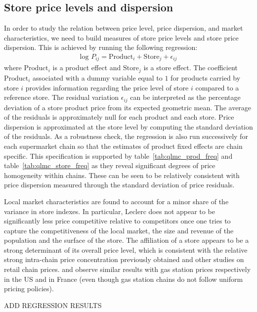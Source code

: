 \documentclass[english]{article}
\begin{document}
\subsection{Store price levels and dispersion}

In order to study the relation between price level, price dispersion, and market characteristics, we need to build measures of store price levels and store price dispersion. This is achieved by running the following regression:
\begin{align*}
\text{log }P_{ij} = \text{Product}_i + \text{Store}_j + \epsilon_{ij}
\end{align*}
where $\text{Product}_i$ is a product effect and $\text{Store}_j$ is a store effect. The coefficient $\text{Product}_i$ associated with a dummy variable equal to $1$ for products carried by store $i$ provides information regarding the price level of store $i$ compared to a reference store. The residual variation $\epsilon_{ij}$ can be interpreted as the percentage deviation of a store product price from its expected geometric mean. The average of the residuals is approximately null for each product and each store. Price dispersion is approximated at the store level by computing the standard deviation of the residuals. As a robustness check, the regression is also run successively for each supermarket chain so that the estimates of product fixed effects are chain specific. This specification is supported by table~\ref{tab:qlmc_prod_freq} and table~\ref{tab:qlmc_store_freq} as they reveal significant degrees of price homogeneity within chains. These can be seen to be relatively consistent with price dispersion measured through the standard deviation of price residuals.

Local market characteristics are found to account for a minor share of the variance in store indexes. In particular, Leclerc does not appear to be significantly less price competitive relative to competitors once one tries to capture the competitiveness of the local market, the size and revenue of the population and the surface of the store. The affiliation of a store appears to be a strong determinant of its overall price level, which is consistent with the relative strong intra-chain price concentration previously obtained and other studies on retail chain prices. \cite{HOS08} and \cite{CHA16} observe similar results with gas station prices respectively in the US and in France (even though gas station chains do not follow uniform pricing policies).

ADD REGRESSION RESULTS
\end{document}
